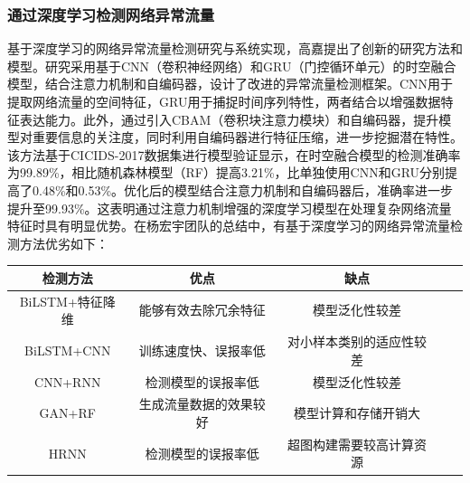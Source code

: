 \subsubsection{通过深度学习检测网络异常流量}
基于深度学习的网络异常流量检测研究与系统实现，高嘉提出了创新的研究方法和模型\cite{高嘉2023基于深度学习的网络异常流量检测研究与系统实现}。研究采用基于CNN（卷积神经网络）和GRU（门控循环单元）的时空融合模型，结合注意力机制和自编码器，设计了改进的异常流量检测框架。CNN用于提取网络流量的空间特征，GRU用于捕捉时间序列特性，两者结合以增强数据特征表达能力。此外，通过引入CBAM（卷积块注意力模块）和自编码器，提升模型对重要信息的关注度，同时利用自编码器进行特征压缩，进一步挖掘潜在特性。该方法基于CICIDS-2017数据集进行模型验证显示，在时空融合模型的检测准确率为99.89\%，相比随机森林模型（RF）提高3.21\%，比单独使用CNN和GRU分别提高了0.48\%和0.53\%。优化后的模型结合注意力机制和自编码器后，准确率进一步提升至99.93\%。这表明通过注意力机制增强的深度学习模型在处理复杂网络流量特征时具有明显优势。在杨宏宇团队的总结中，有基于深度学习的网络异常流量检测方法优劣如下\cite{yang2024network}：
\begin{table}[htbp]
    \vspace{0.5em}\centering\wuhao
    \begin{tabular}{ccccc}
        \toprule
        检测方法        & 优点          & 缺点           \\
        \midrule
        BiLSTM+特征降维 & 能够有效去除冗余特征  & 模型泛化性较差      \\
        BiLSTM+CNN  & 训练速度快、误报率低  & 对小样本类别的适应性较差 \\
        CNN+RNN     & 检测模型的误报率低   & 模型泛化性较差      \\
        GAN+RF      & 生成流量数据的效果较好 & 模型计算和存储开销大   \\
        HRNN        & 检测模型的误报率低   & 超图构建需要较高计算资源 \\
        \bottomrule
    \end{tabular}
\end{table}
\newpage

